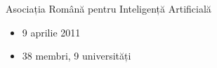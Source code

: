 \documentclass{beamer}
\begin{document}
\begin{frame}[t]
	\begin{center}
		\LARGE{Asociația Română pentru Inteligență Artificială}
	\end{center}%
	\begin{itemize}
		\item 9 aprilie 2011
		\item 38 membri, 9 universități
	\end{itemize}
	\pause
	
	\begin{center}
	\begin{columns}[h]
			\pause
			\pause
	\end{columns}
	\end{center}%
	

\end{frame}
\end{document}
